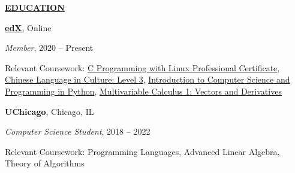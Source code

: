 \documentclass[
]{article}
\providecommand{\tightlist}{%
  \setlength{\itemsep}{0pt}\setlength{\parskip}{0pt}}
\begin{document}





\textbf{\underline{EDUCATION}}

\href{https://www.edx.org/}{\textbf{edX}}, Online

\emph{Member}, 2020 -- Present

Relevant Coursework: 
 \href{https://credentials.edx.org/credentials/1782d3571b2945de9b421230968ace62/}{C Programming with Linux Professional Certificate},
 \href{https://courses.edx.org/certificates/675cc428e361416088f6761ff6003cc1}{Chinese Language in Culture: Level 3}, 
\href{https://courses.edx.org/certificates/6b651e19ead94fcab76c5acb0e125f86}{Introduction to Computer Science and Programming in Python},
 \href{https://courses.edx.org/certificates/427a45b7df034c2a9fb085b0993bdec0}{Multivariable Calculus 1: Vectors and Derivatives} 






\textbf{UChicago}, Chicago, IL

\emph{Computer Science Student}, 2018 -- 2022


Relevant Coursework: %
Programming Languages,
Advanced Linear Algebra, %
Theory of Algorithms

\end{document}
